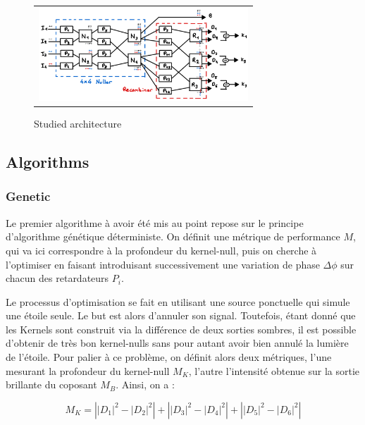 \documentclass{aa}
\begin{document}
    \begin{figure}[H]
        \begin{center}
        \begin{tabular}{c}
        \includegraphics[height=3.5cm]{img/scheme.png}
        \end{tabular}
        \end{center}
        \caption[architecture] 
        { \label{fig:architecture} 
        Studied architecture}
    \end{figure}

    \subsection{Algorithms}
        \subsubsection{Genetic}
            Le premier algorithme à avoir été mis au point repose sur le principe d'algorithme génétique déterministe. On définit une métrique de performance $M$, qui va ici correspondre à la profondeur du kernel-null, puis on cherche à l'optimiser en faisant introduisant successivement une variation de phase $\Delta \phi$ sur chacun des retardateurs $P_i$.

            Le processus d'optimisation se fait en utilisant une source ponctuelle qui simule une étoile seule. Le but est alors d'annuler son signal. Toutefois, étant donné que les Kernels sont construit via la différence de deux sorties sombres, il est possible d'obtenir de très bon kernel-nulls sans pour autant avoir bien annulé la lumière de l'étoile. Pour palier à ce problème, on définit alors deux métriques, l'une mesurant la profondeur du kernel-null $M_K$, l'autre l'intensité obtenue sur la sortie brillante du coposant $M_B$. Ainsi, on a :

            \begin{equation}
                M_K = \left||D_1|^2 - |D_2|^2\right| + \left||D_3|^2 - |D_4|^2\right| + \left||D_5|^2 - |D_6|^2\right|
            \end{equation}
\end{document}
